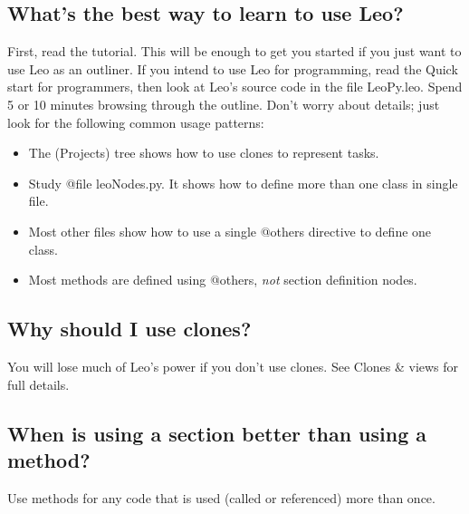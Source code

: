 \documentclass[a4paper,10pt,english]{sphinxmanual}
\begin{document}
\subsection{What's the best way to learn to use Leo?}
\label{FAQ:what-s-the-best-way-to-learn-to-use-leo}
First, read the tutorial. This will be enough to get you started if you just
want to use Leo as an outliner. If you intend to use Leo for programming, read
the Quick start for programmers, then look at Leo's source code in the file LeoPy.leo.
Spend 5 or 10 minutes browsing through the outline. Don't worry about details;
just look for the following common usage patterns:
\begin{itemize}
\item {} 
The (Projects) tree shows how to use clones to represent tasks.

\item {} 
Study @file leoNodes.py.
It shows how to define more than one class in single file.

\item {} 
Most other files show how to use a single @others directive to define one class.

\item {} 
Most methods are defined using @others, \emph{not} section definition nodes.

\end{itemize}


\subsection{Why should I use clones?}
\label{FAQ:why-should-i-use-clones}
You will lose much of Leo's power if you don't use clones.
See Clones \& views for full details.


\subsection{When is using a section better than using a method?}
\label{FAQ:when-is-using-a-section-better-than-using-a-method}
Use methods for any code that is used (called or referenced) more than once.
\end{document}
